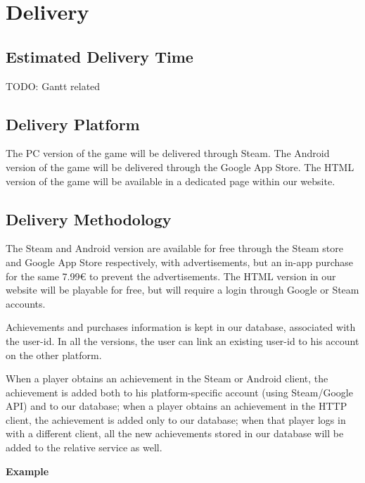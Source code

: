 \section{Delivery}
\subsection{Estimated Delivery Time}
TODO: Gantt related

\subsection{Delivery Platform}
The PC      version of the game will be delivered through Steam. 
The Android version of the game will be delivered through the Google App Store.
The HTML    version of the game will be available in a dedicated page within our website.

\subsection{Delivery Methodology}
The Steam and Android version are available for free through the Steam store and Google App Store respectively, with advertisements, but an in-app purchase for the same 7.99€ to prevent the advertisements.
The HTML version in our website will be playable for free, but will require a login through Google or Steam accounts.

Achievements and purchases information is kept in our database, associated with the user-id. 
In all the versions, the user can link an existing user-id to his account on the other platform. 

When a player obtains an achievement in the Steam or Android client, the achievement is added both to his platform-specific account (using Steam/Google API) and to our database; when a player obtains an achievement in the HTTP client, the achievement is added only to our database; when that player logs in with a different client, all the new achievements stored in our database will be added to the relative service as well.

\textbf{Example}


